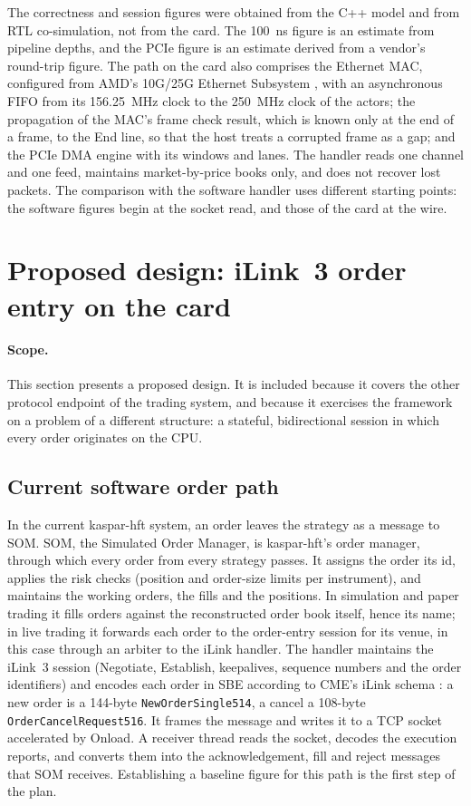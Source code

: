 \documentclass[11pt]{article}
\begin{document}
The correctness and session figures were obtained from the C++ model and from
RTL co-simulation, not from the card. The 100~ns figure is an estimate from
pipeline depths, and the PCIe figure is an estimate derived from a vendor's
round-trip figure. The path on the card also comprises the Ethernet MAC,
configured from AMD's 10G/25G Ethernet Subsystem \cite{pg210}, with an
asynchronous FIFO from its 156.25~MHz clock to the 250~MHz clock of the actors;
the propagation of the MAC's frame check result, which is known only at the end
of a frame, to the End line, so that the host treats a corrupted frame as a
gap; and the PCIe DMA engine with its windows and lanes. The handler reads one
channel and one feed, maintains market-by-price books only, and does not
recover lost packets. The comparison with the software handler uses different
starting points: the software figures begin at the socket read, and those of
the card at the wire.

\section{Proposed design: iLink~3 order entry on the card}
\label{sec:ilink}

\paragraph{Scope.} This section presents a proposed design. It is included because it covers the
other protocol endpoint of the trading system, and because it exercises the
framework on a problem of a different structure: a stateful, bidirectional
session in which every order originates on the CPU.

\subsection{Current software order path}

In the current kaspar-hft system, an order leaves the strategy as a message to
SOM. SOM, the Simulated Order Manager, is kaspar-hft's order manager, through
which every order from every strategy passes. It assigns the order its id,
applies the risk checks (position and order-size limits per instrument), and
maintains the working orders, the fills and the positions. In simulation and
paper trading it fills orders against the reconstructed order book itself,
hence its name; in live trading it forwards each order to the order-entry
session for its venue, in this case through an arbiter to the iLink handler.
The handler maintains the iLink~3 session (Negotiate, Establish, keepalives,
sequence numbers and the order identifiers) and encodes each order in SBE
according to CME's iLink schema \cite{cmeilink3}: a new order is a 144-byte
\texttt{NewOrderSingle514}, a cancel a 108-byte
\texttt{OrderCancelRequest516}. It frames the message and writes it to a TCP
socket accelerated by Onload. A receiver thread reads the socket, decodes the
execution reports, and converts them into the acknowledgement, fill and reject
messages that SOM receives. Establishing a baseline figure for this path is the
first step of the plan.
\end{document}
